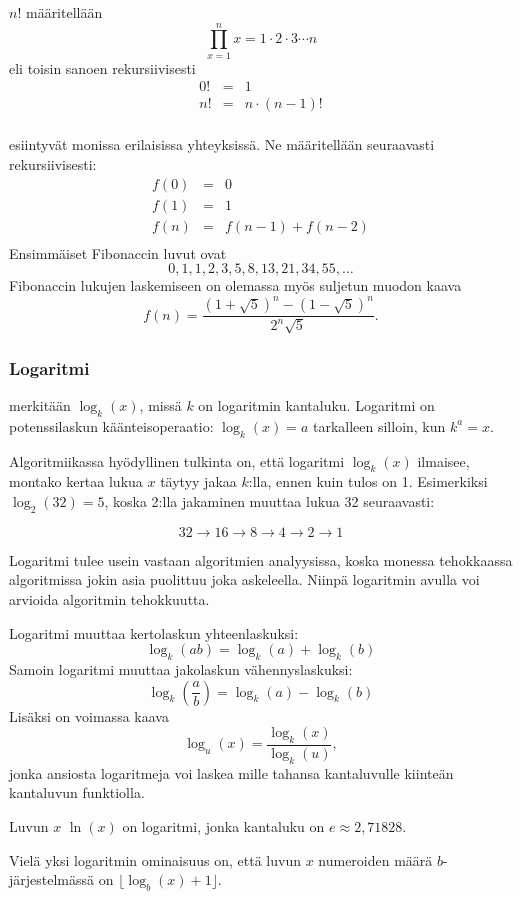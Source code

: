 
 $n!$ määritellään
\[\prod_{x=1}^n x = 1 \cdot 2 \cdot 3 \cdots n\]
eli toisin sanoen rekursiivisesti
\[
\begin{array}{lcl}
0! & = & 1 \\
n! & = & n \cdot (n-1)! \\
\end{array}
\]


 esiintyvät monissa erilaisissa yhteyksissä.
Ne määritellään seuraavasti rekursiivisesti:
\[
\begin{array}{lcl}
f(0) & = & 0 \\
f(1) & = & 1 \\
f(n) & = & f(n-1)+f(n-2) \\
\end{array}
\]
Ensimmäiset Fibonaccin luvut ovat
\[0, 1, 1, 2, 3, 5, 8, 13, 21, 34, 55, \ldots\]
Fibonaccin lukujen laskemiseen on olemassa myös
suljetun muodon kaava
\[f(n)=\frac{(1 + \sqrt{5})^n - (1-\sqrt{5})^n}{2^n \sqrt{5}}.\]

\subsubsection{Logaritmi}


 merkitään $\log_k(x)$, missä $k$ on logaritmin kantaluku.
Logaritmi on potenssilaskun käänteisoperaatio:
$\log_k(x)=a$ tarkalleen silloin, kun $k^a=x$.

Algoritmiikassa hyödyllinen tulkinta on,
että logaritmi $\log_k(x)$ ilmaisee, montako kertaa lukua $x$
täytyy jakaa $k$:lla, ennen kuin tulos on 1.
Esimerkiksi $\log_2(32)=5$, koska 2:lla jakaminen
muuttaa lukua 32 seuraavasti:

\[32 \rightarrow 16 \rightarrow 8 \rightarrow 4 \rightarrow 2 \rightarrow 1 \]

Logaritmi tulee usein vastaan algoritmien analyysissa,
koska monessa tehokkaassa algoritmissa jokin asia puolittuu
joka askeleella.
Niinpä logaritmin avulla voi arvioida algoritmin tehokkuutta.

Logaritmi muuttaa kertolaskun yhteenlaskuksi:
\[\log_k(ab) = \log_k(a)+\log_k(b)\]
Samoin logaritmi muuttaa jakolaskun vähennyslaskuksi:
\[\log_k(\frac{a}{b}) = \log_k(a)-\log_k(b)\]
Lisäksi on voimassa kaava
\[\log_u(x) = \frac{\log_k(x)}{\log_k(u)},\]
jonka ansiosta logaritmeja voi laskea mille tahansa kantaluvulle
kiinteän kantaluvun funktiolla.


Luvun $x$  $\ln(x)$ on logaritmi, jonka kantaluku on
 $e \approx 2{,}71828$.

Vielä yksi logaritmin ominaisuus on, että
luvun $x$ numeroiden määrä $b$-järjestelmässä
on $\lfloor \log_b(x)+1 \rfloor$.


